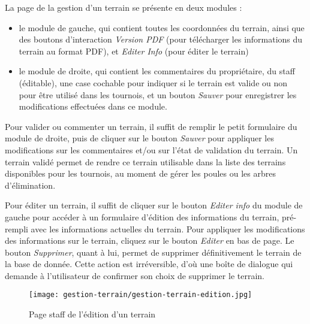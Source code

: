 La page de la gestion d'un terrain se présente en deux modules :

\begin{itemize}
\item le module de gauche, qui contient toutes les coordonnées du terrain, ainsi que des boutons d'interaction \textit{Version PDF} (pour télécharger les informations du terrain au format PDF), et \textit{Editer Info} (pour éditer le terrain)
\item le module de droite, qui contient les commentaires du propriétaire, du staff (éditable), une case cochable pour indiquer si le terrain est valide ou non pour être utilisé dans les tournois, et un bouton \textit{Sauver} pour enregistrer les modifications effectuées dans ce module.
\end{itemize}
\bigskip

Pour valider ou commenter un terrain, il suffit de remplir le petit formulaire du module de droite, puis de cliquer sur le bouton \textit{Sauver} pour appliquer les modifications sur les commentaires et/ou sur l'état de validation du terrain. Un terrain validé permet de rendre ce terrain utilisable dans la liste des terrains disponibles pour les tournois, au moment de gérer les poules ou les arbres d'élimination.\newline

Pour éditer un terrain, il suffit de cliquer sur le bouton \textit{Editer info} du module de gauche pour accéder à un formulaire d'édition des informations du terrain, pré-rempli avec les informations actuelles du terrain. Pour appliquer les modifications des informations sur le terrain, cliquez sur le bouton \textit{Editer} en bas de page. Le bouton \textit{Supprimer}, quant à lui, permet de supprimer définitivement le terrain de la base de donnée. Cette action est irréversible, d'où une boîte de dialogue qui demande à l'utilisateur de confirmer son choix de supprimer le terrain.

\begin{figure}[H]
\centering
\texttt{[image: gestion-terrain/gestion-terrain-edition.jpg]}
\caption{Page staff de l'édition d'un terrain}
\end{figure}
